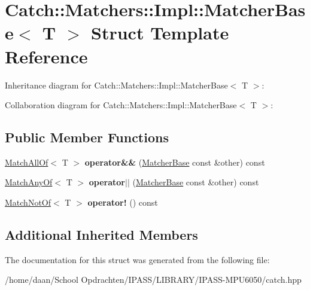 \hypertarget{structCatch_1_1Matchers_1_1Impl_1_1MatcherBase}{}\section{Catch\+:\+:Matchers\+:\+:Impl\+:\+:Matcher\+Base$<$ T $>$ Struct Template Reference}
\label{structCatch_1_1Matchers_1_1Impl_1_1MatcherBase}


Inheritance diagram for Catch\+:\+:Matchers\+:\+:Impl\+:\+:Matcher\+Base$<$ T $>$\+:


Collaboration diagram for Catch\+:\+:Matchers\+:\+:Impl\+:\+:Matcher\+Base$<$ T $>$\+:
\subsection*{Public Member Functions}
\begin{DoxyCompactItemize}
\item 
\mbox{\label{structCatch_1_1Matchers_1_1Impl_1_1MatcherBase_a23c336f6d9457735ddc8dc7ea864d7c9}} 
\hyperlink{structCatch_1_1Matchers_1_1Impl_1_1MatchAllOf}{Match\+All\+Of}$<$ T $>$ {\bfseries operator\&\&} (\hyperlink{structCatch_1_1Matchers_1_1Impl_1_1MatcherBase}{Matcher\+Base} const \&other) const
\item 
\mbox{\label{structCatch_1_1Matchers_1_1Impl_1_1MatcherBase_a5f8542b8f1567a6f9c65d0a6da7b679b}} 
\hyperlink{structCatch_1_1Matchers_1_1Impl_1_1MatchAnyOf}{Match\+Any\+Of}$<$ T $>$ {\bfseries operator$\vert$$\vert$} (\hyperlink{structCatch_1_1Matchers_1_1Impl_1_1MatcherBase}{Matcher\+Base} const \&other) const
\item 
\mbox{\label{structCatch_1_1Matchers_1_1Impl_1_1MatcherBase_a5bb94bf2ff5c7ef73b7c11eb173bdf3b}} 
\hyperlink{structCatch_1_1Matchers_1_1Impl_1_1MatchNotOf}{Match\+Not\+Of}$<$ T $>$ {\bfseries operator!} () const
\end{DoxyCompactItemize}
\subsection*{Additional Inherited Members}


The documentation for this struct was generated from the following file\+:\begin{DoxyCompactItemize}
\item 
/home/daan/\+School Opdrachten/\+I\+P\+A\+S\+S/\+L\+I\+B\+R\+A\+R\+Y/\+I\+P\+A\+S\+S-\/\+M\+P\+U6050/catch.\+hpp\end{DoxyCompactItemize}
